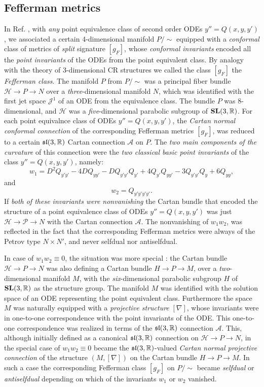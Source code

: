 \documentclass[letterpaper]{amsart}
\theoremstyle{definition}
\theoremstyle{remark}
\begin{document}
\subsection{Fefferman metrics}
In Ref. \cite{ns}, with \emph{any} point equivalence class of second
order ODEs $y''=Q(x,y,y')$, we associated a certain 4-dimensional
manifold $P/\sim$ equipped with a \emph{conformal} class of
metrics of \emph{split} signature $[g_F]$, whose \emph{conformal
  invariants} encoded all the \emph{point invariants} of the ODEs from
the point equivalent class. By analogy with the theory of
3-dimensional CR structures we called the class $[g_F]$ the
\emph{Fefferman class}. The manifold $P$ from 
$P/\sim$ was a principal fiber bundle ${\mathcal
  H}\to P\to N$ over a \emph{three}-dimensional manifold $N$, which was
identified with the first jet space ${\mathcal J}^1$ of an ODE from
the equivalence class. The bundle $P$ was 8-dimensional, and
  ${\mathcal H}$ was a \emph{five}-dimensional parabolic subgroup of
$\mathbf{SL}(3,\mathbb{R})$. For each point equivalnce class of ODEs
$y''=Q(x,y,y')$, the 
\emph{Cartan normal conformal connection} of the corresponding 
Fefferman metrics $[g_F]$, was reduced to a certain $\mathfrak{sl}(3,\mathbb{R})$
Cartan connection $\mathcal A$ on $P$. 
The \emph{two main components of the 
curvature} of this connection were the \emph{two classical basic point 
invariants} of the class $y''=Q(x,y,y')$, namely:
$$w_1=D^2Q_{y'y'} - 4DQ_{yy'} - DQ_{y'y'} Q_{y'} + 4Q_{y'}
  Q_{yy'} - 3Q_{y'y'} Q_y + 6Q_{yy},$$
and
$$ w_2=Q_{y'y'y'y'}.$$  
If \emph{both of these invariants were nonvanishing} the Cartan bundle that
encoded the structure of a point equivalence class of ODEs
$y''=Q(x,y,y')$ was just ${\mathcal H}\to{\mathcal P}\to N$ with the
Cartan connection $\mathcal A$. The nonvanishing of $w_1w_2$, was
reflected in the fact that the corresponding Fefferman metrics were
always of the Petrov type $N\times N'$, and never selfdual nor
antiselfdual. 

In case of $w_1w_2\equiv 0$, the
situation was more special \cite{nn}: the Cartan bundle ${\mathcal H}\to P\to N$
was also defining a Cartan bundle $H\to P\to M$, over a \emph{two}-dimensional
manifold $M$, with the \emph{six}-dimensional parabolic subgroup $H$
of $\mathbf{SL}(3,\mathbb{R})$ as the structure group. The
manifold $M$ was identified with the solution space of an ODE
representing the point equivalent class. Furthermore the space $M$ was
naturally equipped with a \emph{projective structure} $[\nabla]$, whose
invariants were in one-to-one correspondence with the point invariants
of the ODE. This one-to-one correspondence was realized in terms of
the $\mathfrak{sl}(3,\mathbb{R})$ connection ${\mathcal A}$. This, although initially defined 
as a canonical $\mathfrak{sl}(3,\mathbb{R})$ connection on 
${\mathcal H}\to P\to N$, in the special case of $w_1w_2\equiv 0$ 
became the $\mathfrak{sl}(3,\mathbb{R})$-valued \emph{Cartan normal projective connection} of the structure 
$(M,[\nabla])$ on the Cartan bundle $H\to P\to M$. In such a case the
corresponding Fefferman class $[g_F]$ on $P/\sim$ became
\emph{selfdual} or \emph{antiselfdual} depending on which of the
invariants $w_1$ or $w_2$ vanished.               
\end{document}
